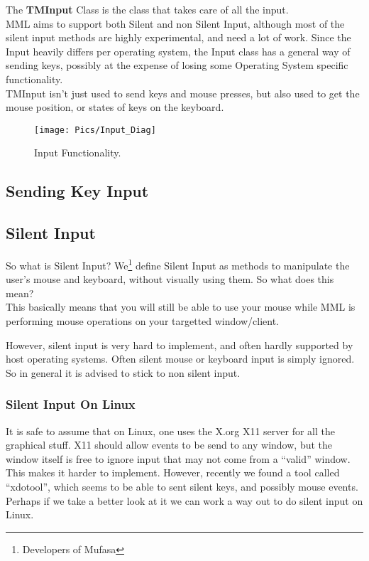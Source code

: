 \documentclass[a4paper]{report}
\begin{document}
The \textbf{TMInput} Class is the class that takes care of all the input. \\
MML aims to support both Silent and non Silent Input, although most of the
silent input methods are highly experimental, and need a lot of work.
Since the Input heavily differs per operating system, 
the Input class has a general way of sending keys, possibly at the expense
of losing some Operating System specific functionality. \\

TMInput isn't just used to send keys and mouse presses, but also used to get the
mouse position, or states of keys on the keyboard.

\begin{figure}[ht]
	\texttt{[image: Pics/Input\_Diag]}
	\caption{Input Functionality.}
\end{figure}

\subsection{Sending Key Input}


\subsection{Silent Input}

So what is Silent Input?
We\footnote{Developers of Mufasa} define Silent Input as
methods to manipulate the user's mouse and keyboard, without visually using
them. So what does this mean? \\

This basically means that you will still be able to use your mouse while
MML is performing mouse operations on your targetted window/client.

However, silent input is very hard to implement, and often hardly supported
by host operating systems. Often silent mouse or keyboard input is simply 
ignored. So in general it is advised to stick to non silent input.

\subsubsection{Silent Input On Linux}
It is safe to assume that on Linux, one uses the X.org X11 server for all the
graphical stuff. X11 should allow events to be send to any window, but the
window itself is free to ignore input that may not come from a ``valid'' window.
This makes it harder to implement. However, recently we found a tool called
``xdotool'', which seems to be able to sent silent keys, and possibly mouse
events. Perhaps if we take a better look at it we can work a way out to do
silent input on Linux.
\end{document}

